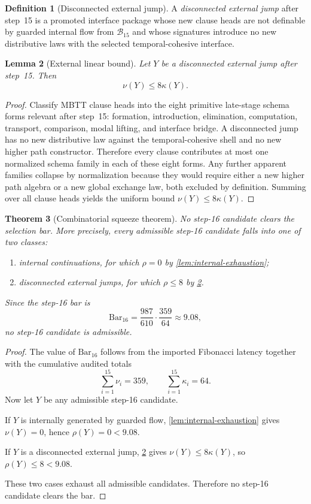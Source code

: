 \documentclass[11pt]{article}
\theoremstyle{plain}
\newtheorem{theorem}{Theorem}[section]
\newtheorem{lemma}[theorem]{Lemma}
\theoremstyle{definition}
\newtheorem{definition}[theorem]{Definition}
\theoremstyle{remark}
\newcommand{\B}{\mathcal{B}}
\newcommand{\SelBar}{\mathrm{Bar}}
\begin{document}
\begin{definition}[Disconnected external jump]
\label{def:external-jump}
A \emph{disconnected external jump} after step~15 is a promoted interface package whose new clause heads are not definable by guarded internal flow from $\B_{15}$ and whose signatures introduce no new distributive laws with the selected temporal-cohesive interface.
\end{definition}

\begin{lemma}[External linear bound]
\label{lem:external-linear}
Let $Y$ be a disconnected external jump after step~15. Then
\[
  \nu(Y)\le 8\kappa(Y).
\]
\end{lemma}

\begin{proof}
Classify MBTT clause heads into the eight primitive late-stage schema forms relevant after step~15: formation, introduction, elimination, computation, transport, comparison, modal lifting, and interface bridge. A disconnected jump has no new distributive law against the temporal-cohesive shell and no new higher path constructor. Therefore every clause contributes at most one normalized schema family in each of these eight forms. Any further apparent families collapse by normalization because they would require either a new higher path algebra or a new global exchange law, both excluded by definition. Summing over all clause heads yields the uniform bound $\nu(Y)\le 8\kappa(Y)$.
\end{proof}

\begin{theorem}[Combinatorial squeeze theorem]
\label{thm:squeeze}
No step-16 candidate clears the selection bar. More precisely, every admissible step-16 candidate falls into one of two classes:
\begin{enumerate}
    \item \emph{internal continuations}, for which $\rho=0$ by \cref{lem:internal-exhaustion};
    \item \emph{disconnected external jumps}, for which $\rho\le 8$ by \cref{lem:external-linear}.
\end{enumerate}
Since the step-16 bar is
\[
  \SelBar_{16}=\frac{987}{610}\cdot\frac{359}{64}\approx 9.08,
\]
no step-16 candidate is admissible.
\end{theorem}

\begin{proof}
The value of $\SelBar_{16}$ follows from the imported Fibonacci latency together with the cumulative audited totals
\[
  \sum_{i=1}^{15}\nu_i=359,
  \qquad
  \sum_{i=1}^{15}\kappa_i=64.
\]
Now let $Y$ be any admissible step-16 candidate.

If $Y$ is internally generated by guarded flow, \cref{lem:internal-exhaustion} gives $\nu(Y)=0$, hence $\rho(Y)=0<9.08$.

If $Y$ is a disconnected external jump, \cref{lem:external-linear} gives $\nu(Y)\le 8\kappa(Y)$, so $\rho(Y)\le 8<9.08$.

These two cases exhaust all admissible candidates. Therefore no step-16 candidate clears the bar.
\end{proof}
\end{document}
